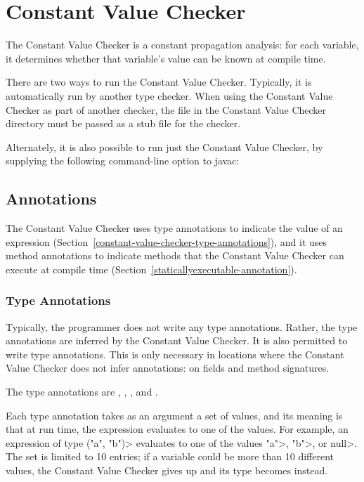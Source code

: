 \htmlhr
\chapter{Constant Value Checker\label{constant-value-checker}}

The Constant Value Checker is a constant propagation analysis: for
each variable, it determines whether that variable's value can be
known at compile time.

There are two ways to run the Constant Value Checker.
Typically, it is automatically run by another type checker.
When using the Constant Value Checker as part of another checker, the
 file in the Constant Value Checker directory must
be passed as a stub file for the checker.

Alternately, it is also possible to run just the Constant Value Checker, by
supplying the following command-line option to javac:

\section{Annotations\label{constant-value-checker-annotations}}

The Constant Value Checker uses type annotations to indicate the value of
an expression (Section~\ref{constant-value-checker-type-annotations}), and
it uses method annotations to indicate methods that the Constant Value
Checker can execute at compile time
(Section~\ref{staticallyexecutable-annotation}).


\subsection{Type Annotations\label{constant-value-checker-type-annotations}}

Typically, the programmer does not write any type annotations.  Rather, the
type annotations are inferred by the Constant Value Checker.
It is also permitted to write type annotations.  This is only necessary in
locations where the Constant Value Checker does not infer annotations:  on fields
and method signatures.

The type annotations are
,
,
, and
.

Each type annotation takes as an argument a set of values, and its meaning
is that at run time, the expression evaluates to one of the values.  For
example, an expression of type
\<("a", "b")> evaluates to
one of the values \<"a">, \<"b">, or \<null>.
The set is limited to 10 entries; if a variable
could be more than 10 different values, the Constant Value
Checker gives up and its type becomes
 instead.

